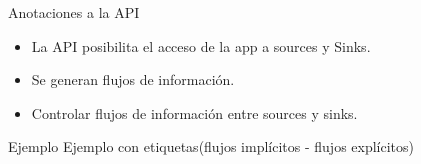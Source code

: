 \begin{frame}{Anotaciones a la API} 
\begin{block}{}
	\begin{itemize}
	  \item La API posibilita el acceso de la app a sources y Sinks.
	  \item Se generan flujos de información.
	  \item Controlar flujos de información entre sources y sinks.
	\end{itemize}
\end{block}
\begin{block}{Ejemplo}
Ejemplo con etiquetas(flujos implícitos - flujos explícitos)
\end{block}
\end{frame}
% 
% 
